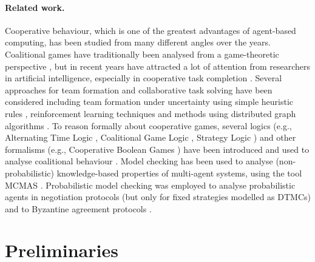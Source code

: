 \documentclass{llncs}
\begin{document}
\paragraph{Related work.} Cooperative behaviour, which is one of the greatest advantages of agent-based computing, has been studied from many different angles over the years.
Coalitional games have traditionally been analysed from a game-theoretic perspective \cite{osborne1994course}, but in recent years have attracted a lot of attention from researchers in artificial intelligence, especially in cooperative task completion \cite{shehory1998methods}.
Several approaches for team formation and collaborative task solving have been considered including team formation under uncertainty using simple heuristic rules \cite{kraus2003coalition}, reinforcement learning techniques \cite{abdallah2004organization} and methods using distributed graph algorithms \cite{manisterski2006forming}.
To reason formally about cooperative games, several logics (e.g., Alternating Time Logic \cite{AlurHK02}, Coalitional Game Logic \cite{agotnes2009reasoning}, Strategy Logic \cite{chatterjee2007strategy}) and other formalisms (e.g., Cooperative Boolean Games \cite{dunne2008cooperative}) have been introduced and used to analyse coalitional behaviour \cite{bonzon2007efficient}.
Model checking has been used to analyse (non-probabilistic) knowledge-based properties of multi-agent systems,
using the tool MCMAS \cite{lomuscio2006mcmas}.
Probabilistic model checking was employed to
analyse probabilistic agents in negotiation protocols \cite{BFW06b}
(but only for fixed strategies modelled as DTMCs)
and to Byzantine agreement protocols \cite{KN02}.
\section{Preliminaries}
\end{document}
